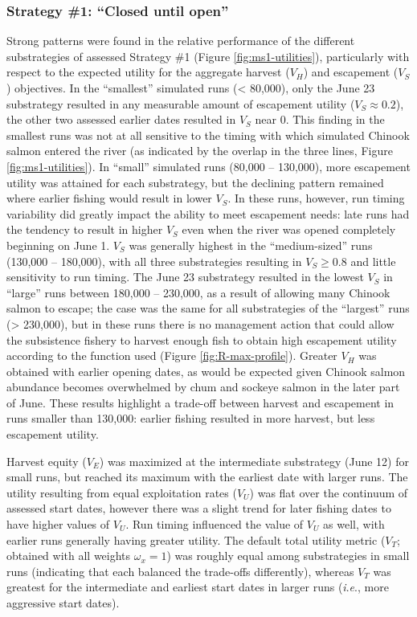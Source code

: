 \documentclass[12pt,]{book}
\theoremstyle{definition}
\theoremstyle{definition}
\theoremstyle{definition}
\theoremstyle{remark}
\begin{document}
\subsubsection{\texorpdfstring{Strategy \#1: ``Closed until
open''}{Strategy \#1: Closed until open}}\label{strategy-1-closed-until-open-1}

\noindent
Strong patterns were found in the relative performance of the different
substrategies of assessed Strategy \#1 (Figure \ref{fig:ms1-utilities}),
particularly with respect to the expected utility for the aggregate
harvest (\(V_H\)) and escapement (\(V_S\)) objectives. In the
``smallest'' simulated runs (\textless{} 80,000), only the June 23
substrategy resulted in any measurable amount of escapement utility
(\(V_S \approx 0.2\)), the other two assessed earlier dates resulted in
\(V_S\) near 0. This finding in the smallest runs was not at all
sensitive to the timing with which simulated Chinook salmon entered the
river (as indicated by the overlap in the three lines, Figure
\ref{fig:ms1-utilities}). In ``small'' simulated runs (80,000 --
130,000), more escapement utility was attained for each substrategy, but
the declining pattern remained where earlier fishing would result in
lower \(V_S\). In these runs, however, run timing variability did
greatly impact the ability to meet escapement needs: late runs had the
tendency to result in higher \(V_S\) even when the river was opened
completely beginning on June 1. \(V_S\) was generally highest in the
``medium-sized'' runs (130,000 -- 180,000), with all three substrategies
resulting in \(V_S \geq 0.8\) and little sensitivity to run timing. The
June 23 substrategy resulted in the lowest \(V_S\) in ``large'' runs
between 180,000 -- 230,000, as a result of allowing many Chinook salmon
to escape; the case was the same for all substrategies of the
``largest'' runs (\textgreater{} 230,000), but in these runs there is no
management action that could allow the subsistence fishery to harvest
enough fish to obtain high escapement utility according to the function
used (Figure \ref{fig:R-max-profile}). Greater \(V_H\) was obtained with
earlier opening dates, as would be expected given Chinook salmon
abundance becomes overwhelmed by chum and sockeye salmon in the later
part of June. These results highlight a trade-off between harvest and
escapement in runs smaller than 130,000: earlier fishing resulted in
more harvest, but less escapement utility.

Harvest equity (\(V_E\)) was maximized at the intermediate substrategy
(June 12) for small runs, but reached its maximum with the earliest date
with larger runs. The utility resulting from equal exploitation rates
(\(V_U\)) was flat over the continuum of assessed start dates, however
there was a slight trend for later fishing dates to have higher values
of \(V_U\). Run timing influenced the value of \(V_U\) as well, with
earlier runs generally having greater utility. The default total utility
metric (\(V_T\); obtained with all weights \(\omega_x = 1\)) was roughly
equal among substrategies in small runs (indicating that each balanced
the trade-offs differently), whereas \(V_T\) was greatest for the
intermediate and earliest start dates in larger runs
(\emph{i}.\emph{e}., more aggressive start dates).
\end{document}
